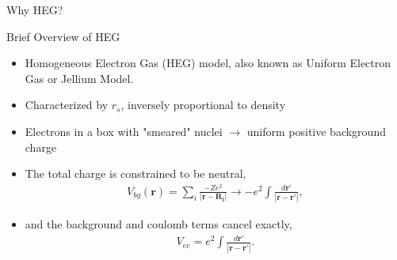 \documentclass[10pt]{beamer}
\begin{document}
{{{{{{\begin{frame}{Why HEG?}
\end{frame}

{%

\begin{frame}{Brief Overview of HEG}
	\begin{itemize}[<+->]
		\item{Homogeneous Electron Gas (HEG) model, also known as Uniform Electron Gas or Jellium 
		Model.}
		\item{Characterized by \alert{$r_s$}, inversely proportional to density}
		\item{Electrons in a box with "smeared" nuclei $\rightarrow$ uniform positive background charge}

		\item{The total charge is constrained to be neutral,}
			\begin{eqnarray}
				V_{bg}(\mathbf{r}) = \sum\limits_{i} \frac{-Ze^2}{|\mathbf{r}-\mathbf{R_i}|} \rightarrow -e^2 \int \frac{d\mathbf{r'}}{|\mathbf{r}-\mathbf{r'}|},
			\end{eqnarray}
		\item{and the background and coulomb terms cancel exactly,
			\begin{eqnarray}
				V_{ee} = e^2 \int \frac{d\mathbf{r'}}{|\mathbf{r}-\mathbf{r'}|}.
			\end{eqnarray}
		}
	\end{itemize}
\end{frame}

{%

}}}}}}}}
\end{document}
